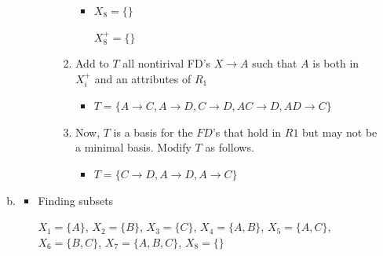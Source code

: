 \documentclass[12pt]{article}
\begin{document}
\begin{enumerate}[1.]
\begin{enumerate}[a)]
\begin{itemize}
\begin{itemize}
\begin{enumerate}[1.]
\begin{itemize}
                        \item $X_8 = \{\}$

                        \bigskip

                        $X_8^+ = \{\}$


                    \end{itemize}
                    \color{black}

                    \item Add to $T$ all nontirival FD's $X \to A$ such that $A$
                    is both in $X_i^+$ and an attributes of $R_1$

                    \color{red}
                    \begin{itemize}
                        \item

                        $T = \{A \to C, A \to D, C \to D, AC \to D, AD \to C\}$
                    \end{itemize}
                    \color{black}

                    \item Now, $T$ is a basis for the $FD$'s that hold in $R1$ but
                    may not be a minimal basis. Modify $T$ as follows.

                    \color{red}
                    \begin{itemize}
                        \item

                        $T = \{C \to D, A \to D , A \to C\}$
                    \end{itemize}
                    \color{black}
                \end{enumerate}
            \end{itemize}
        \end{itemize}

        \item

        \begin{itemize}
            \item Finding subsets

            $X_1 = \{A\}$, $X_2 = \{B\}$, $X_3 = \{C\}$, $X_4 = \{A,B\}$, $X_5 = \{A,C\}$,
            $X_6 = \{B,C\}$, $X_7 = \{A,B,C\}$, $X_8 = \{\}$



\end{itemize}
\end{enumerate}
\end{enumerate}
\end{document}
